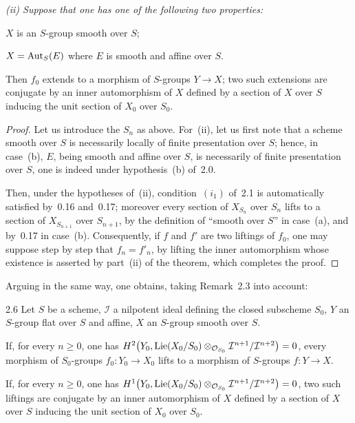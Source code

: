 {\itshape
(ii) Suppose that one has one of the following two properties:
\begin{enumeratea}
\item \(X\) is an \(S\)-group smooth over \(S\);
\item \(X=\operatorname{Aut}_{S}(E)\) where \(E\) is smooth and affine over \(S\).
\end{enumeratea}
\noindent Then \(f_{0}\) extends to a morphism of \(S\)-groups \(Y\to X\); two such
extensions are conjugate by an inner automorphism of \(X\) defined by a section
of \(X\) over \(S\) inducing the unit section of \(X_{0}\) over \(S_{0}\).
\par}

\begin{proof}
\renewcommand{\qedsymbol}{}
Let us introduce the \(S_{n}\) as above.%
{\renewcommand{\thefootnote}{(59)}}
For~(ii), let us first note that a scheme smooth over \(S\) is necessarily
locally of finite presentation over \(S\); hence, in case~(b), \(E\), being
smooth and affine over \(S\), is necessarily of finite presentation over \(S\),
\ie one is indeed under hypothesis~(b) of~2.0.

Then, under the hypotheses of~(ii), condition~\((i_{1})\) of~2.1 is
automatically satisfied by~0.16 and~0.17; moreover every section of
\(X_{S_{n}}\) over \(S_{n}\) lifts to a section of \(X_{S_{n+1}}\) over
\(S_{n+1}\), by the definition of ``smooth over \(S\)'' in case~(a), and
by~0.17 in case~(b). Consequently, if \(f\) and \(f'\) are two liftings of
\(f_{0}\), one may suppose step by step that \(f_{n}=f'_{n}\), by lifting the
inner automorphism whose existence is asserted by part~(ii) of the theorem,
which completes the proof.
\end{proof}

Arguing in the same way, one obtains, taking Remark~2.3 into account:

\begin{corollary}{2.6}\label{III.2.6}
Let \(S\) be a scheme, \(\mathcal{I}\) a nilpotent ideal defining the closed
subscheme \(S_{0}\), \(Y\) an \(S\)-group flat over \(S\) and affine, \(X\) an
\(S\)-group smooth over \(S\).
\begin{enumeratei}
\item If, for every \(n\geqslant 0\), one has
\(H^{2}\bigl(Y_{0},\operatorname{Lie}(X_{0}/S_{0})\otimes_{\mathcal{O}_{S_{0}}}
\mathcal{I}^{n+1}/\mathcal{I}^{n+2}\bigr)=0\), every morphism of \(S_{0}\)-groups
\(f_{0}\colon Y_{0}\to X_{0}\) lifts to a morphism of \(S\)-groups
\(f\colon Y\to X\).
\item If, for every \(n\geqslant 0\), one has
\(H^{1}\bigl(Y_{0},\operatorname{Lie}(X_{0}/S_{0})\otimes_{\mathcal{O}_{S_{0}}}
\mathcal{I}^{n+1}/\mathcal{I}^{n+2}\bigr)=0\), two such liftings are conjugate
by an inner automorphism of \(X\) defined by a section of \(X\) over \(S\)
inducing the unit section of \(X_{0}\) over \(S_{0}\).
\end{enumeratei}
\end{corollary}

